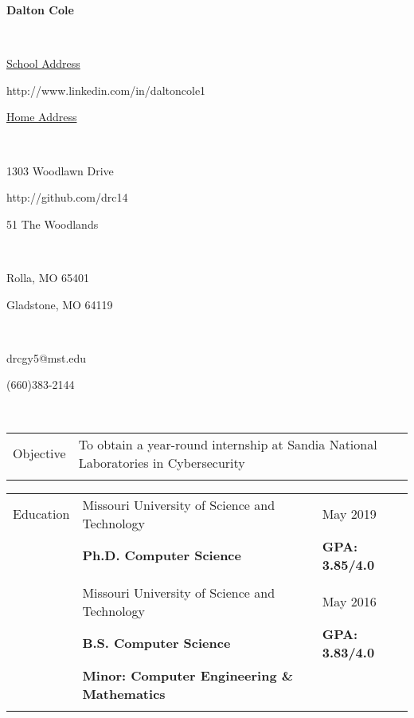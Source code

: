 \documentclass[10.5pt, arial]{article}
\newcommand\textbox[1]{%
  \parbox{.333\textwidth}{#1}%
}
\begin{document}

\noindent\textbox{\hfill}\textbox{\hfil \textbf{Dalton Cole}\hfil}\textbox{\hfill} \\
\noindent\textbox{\underline{School Address}\hfill}\textbox{\hfil http://www.linkedin.com/in/daltoncole1\hfil}\textbox{\hfill \underline{Home Address}} \\
\noindent\textbox{1303 Woodlawn Drive\hfill}\textbox{\hfil http://github.com/drc14\hfil}\textbox{\hfill 51 The Woodlands} \\
\noindent\textbox{Rolla, MO 65401\hfill}\textbox{\hfil \hfil}\textbox{\hfill Gladstone, MO 64119} \\
\noindent\textbox{drcgy5@mst.edu\hfill}\textbox{\hfil \hfil}\textbox{\hfill (660)383-2144} \\
\noindent\makebox[\linewidth]{\rule{\textwidth}{.4pt}} 

\begin{tabular}{p{1.5cm} p{13.2cm} l}
Objective  	& To obtain a year-round internship at Sandia National Laboratories in Cybersecurity 	& 						\\ \\
\end{tabular}

\begin{tabular}{p{1.5cm} p{13.2cm} l}
Education  	& Missouri University of Science and Technology 					& May 2019 				\\
			& \textbf{Ph.D. Computer Science} 									& \textbf{GPA: 3.85/4.0}	\\ \\

		  	& Missouri University of Science and Technology 					& May 2016 				\\
			& \textbf{B.S. Computer Science} 									& \textbf{GPA: 3.83/4.0} \\
			& \textbf{Minor: Computer Engineering \& Mathematics} 										\\ \\
\end{tabular}
\end{document}
